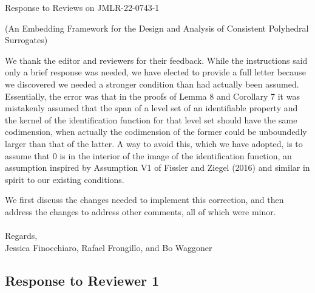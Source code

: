 \documentclass[a4paper]{article}
\begin{document}
\begin{center}
  {\Large Response to Reviews on JMLR-22-0743-1}
  
  (An Embedding Framework for the Design and Analysis of Consistent Polyhedral Surrogates)
\end{center}

We thank the editor and reviewers for their feedback.  While the instructions said only a brief response was needed, we have elected to provide a full letter because we discovered we needed a stronger condition than had actually been assumed.  Essentially, the error was that in the proofs of Lemma 8 and Corollary 7 it was mistakenly assumed that the span of a level set of an identifiable property and the kernel of the identification function for that level set should have the same codimension, when actually the codimension of the former could be unboundedly larger than that of the latter.  A way to avoid this, which we have adopted, is to assume that 0 is in the interior of the image of the identification function, an assumption inspired by Assumption V1 of Fissler and Ziegel (2016) and similar in spirit to our existing conditions.

We first discuss the changes needed to implement this correction, and then address the changes to address other comments, all of which were minor.\\
\\
Regards,\\
Jessica Finocchiaro, Rafael Frongillo, and Bo Waggoner

\subsection*{Response to Reviewer 1}
\end{document}
